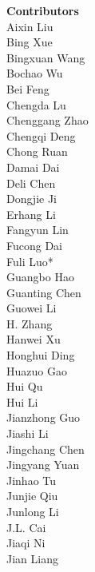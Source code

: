 \documentclass[11pt, a4paper, logo, copyright, nonumbering]{deepseek}
\begin{document}
{\begin{multicols}{2}
\noindent
\textbf{\color{damaiblue} Contributors} \\
\color{damaiblue} 
\color{damaiblue} Aixin Liu \\
\color{damaiblue} Bing Xue \\
\color{damaiblue} Bingxuan Wang \\
\color{damaiblue} Bochao Wu \\
\color{damaiblue} Bei Feng \\
\color{damaiblue} Chengda Lu \\
\color{damaiblue} Chenggang Zhao \\
\color{damaiblue} Chengqi Deng \\
\color{damaiblue} Chong Ruan \\
\color{damaiblue} Damai Dai \\
\color{damaiblue} Deli Chen \\
\color{damaiblue} Dongjie Ji \\
\color{damaiblue} Erhang Li \\
\color{damaiblue} Fangyun Lin \\
\color{damaiblue} Fucong Dai \\
\color{damaiblue} Fuli Luo* \\
\color{damaiblue} Guangbo Hao \\
\color{damaiblue} Guanting Chen \\
\color{damaiblue} Guowei Li \\
\color{damaiblue} H. Zhang \\
\color{damaiblue} Hanwei Xu \\
\color{damaiblue} Honghui Ding \\
\color{damaiblue} Huazuo Gao \\
\color{damaiblue} Hui Qu \\
\color{damaiblue} Hui Li \\
\color{damaiblue} Jianzhong Guo \\
\color{damaiblue} Jiashi Li \\
\color{damaiblue} Jingchang Chen \\
\color{damaiblue} Jingyang Yuan \\
\color{damaiblue} Jinhao Tu \\
\color{damaiblue} Junjie Qiu \\
\color{damaiblue} Junlong Li \\
\color{damaiblue} J.L. Cai \\
\color{damaiblue} Jiaqi Ni \\
\color{damaiblue} Jian Liang \\

\end{multicols}}
\end{document}
